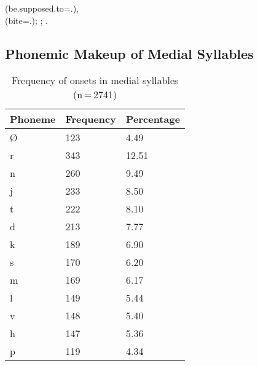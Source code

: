 \pex
	\a {} 
		(be.supposed.to=\Ssg{}.\Aarg{}),\footnotemark\\
		 (bite=\TsgM{}.\Aarg{});
	\a {};
	\a {}.
\xe
{}

\subsection{Phonemic Makeup of Medial Syllables}

\begin{table}[pth]\centering
\caption[Frequency of onsets in medial syllables]{Frequency of onsets in medial syllables (n\,=\,2741)}
\begin{tabu} to 0.5\textwidth{X X[c] X[c]}
\tableheaderfont\toprule
Phoneme
	& Frequency
	& Percentage
	\\
	
\toprule

Ø
	& 123
	& 4.49\pct
	\\

\midrule

r
	& 343
	& 12.51\pct
	\\

n
	& 260
	& 9.49\pct
	\\

j
	& 233
	& 8.50\pct
	\\

t
	& 222
	& 8.10\pct
	\\

d
	& 213
	& 7.77\pct
	\\

k
	& 189
	& 6.90\pct
	\\

s
	& 170
	& 6.20\pct
	\\

m
	& 169
	& 6.17\pct
	\\

l
	& 149
	& 5.44\pct
	\\

v
	& 148
	& 5.40\pct
	\\

h
	& 147
	& 5.36\pct
	\\

p
	& 119
	& 4.34\pct
	\\


\end{tabu}
\end{table}
